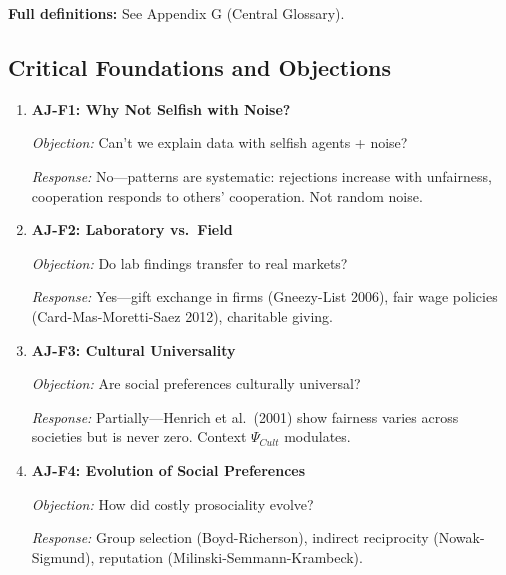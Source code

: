 \textbf{Full definitions:} See Appendix G (Central Glossary).

\subsection{Critical Foundations and Objections}
\label{sec:aj-foundations}


\begin{enumerate}
    \item \textbf{AJ-F1: Why Not Selfish with Noise?}

    \textit{Objection:} Can't we explain data with selfish agents + noise?

    \textit{Response:} No---patterns are systematic: rejections increase with
    unfairness, cooperation responds to others' cooperation. Not random noise.

    \item \textbf{AJ-F2: Laboratory vs.\ Field}

    \textit{Objection:} Do lab findings transfer to real markets?

    \textit{Response:} Yes---gift exchange in firms (Gneezy-List 2006), fair wage
    policies (Card-Mas-Moretti-Saez 2012), charitable giving.

    \item \textbf{AJ-F3: Cultural Universality}

    \textit{Objection:} Are social preferences culturally universal?

    \textit{Response:} Partially---Henrich et al.\ (2001) show fairness varies
    across societies but is never zero. Context $\Psi_{Cult}$ modulates.

    \item \textbf{AJ-F4: Evolution of Social Preferences}

    \textit{Objection:} How did costly prosociality evolve?

    \textit{Response:} Group selection (Boyd-Richerson), indirect reciprocity
    (Nowak-Sigmund), reputation (Milinski-Semmann-Krambeck).
\end{enumerate}

